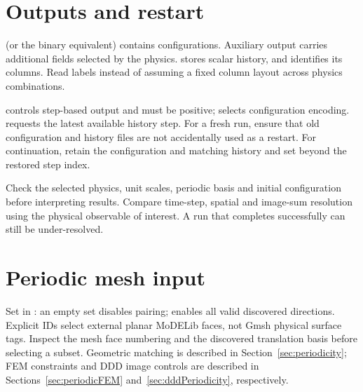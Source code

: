 \section{Outputs and restart}
 (or the binary equivalent) contains configurations. Auxiliary output carries additional fields selected by the physics.  stores scalar history, and  identifies its columns. Read labels instead of assuming a fixed column layout across physics combinations.

 controls step-based output and must be positive;  selects configuration encoding.  requests the latest available history step. For a fresh run, ensure that old configuration and history files are not accidentally used as a restart. For continuation, retain the configuration and matching history and set  beyond the restored step index.

Check the selected physics, unit scales, periodic basis and initial configuration before interpreting results. Compare time-step, spatial and image-sum resolution using the physical observable of interest. A run that completes successfully can still be under-resolved.

\section{Periodic mesh input}
Set  in : an empty set disables pairing;  enables all valid discovered directions. Explicit IDs select external planar MoDELib faces, not Gmsh physical surface tags. Inspect the mesh face numbering and the discovered translation basis before selecting a subset. Geometric matching is described in Section~\ref{sec:periodicity}; FEM constraints and DDD image controls are described in Sections~\ref{sec:periodicFEM} and~\ref{sec:dddPeriodicity}, respectively.
